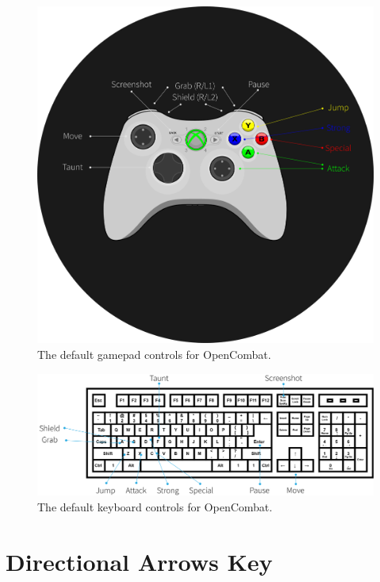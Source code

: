 \begin{figure}[h!]
    \centering
    \includegraphics[width=.8\linewidth]{images/gamepad.png}
    \caption{The default gamepad controls for OpenCombat.}
\end{figure}

\begin{figure}[h!]
    \centering
    \includegraphics[width=1\linewidth]{images/keyboard.png}
    \caption{The default keyboard controls for OpenCombat.}
\end{figure}

\pagebreak

\section{Directional Arrows Key}

